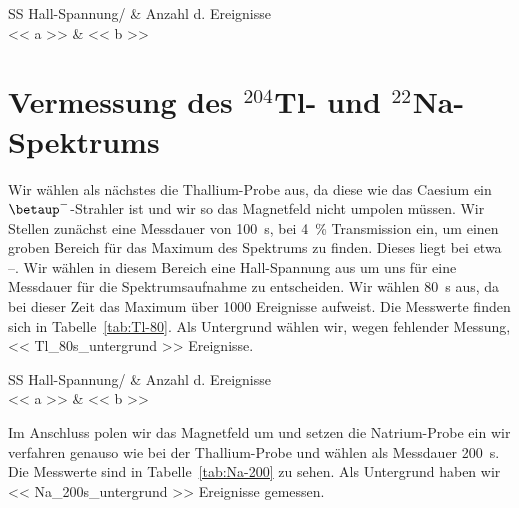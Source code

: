 \begin{table}[htbp]
    \centering
    \begin{tabular}{SS}
        {Hall-Spannung/\si{\skt}} & {Anzahl d. Ereignisse} \\
        \midrule
        << a >> & << b >> \\
    \end{tabular}
    \caption{%
        Messwerte zur Kalibrierung des Spektrometers. Probe: ${}^{137}$Cs,
        Zeit: \SI{100}{\second}, Transmission: \SI{1}{\percent}.
    }
    \label{tab:Cs-100}
\end{table}

\section{Vermessung des ${}^{204}$Tl- und ${}^{22}$Na-Spektrums}

Wir wählen als nächstes die Thallium-Probe aus, da diese wie das Caesium ein
$\betaup^-$-Strahler ist und wir so das Magnetfeld nicht umpolen müssen. Wir
Stellen zunächst eine Messdauer von \SI{100}{\second}, bei \SI{4}{\percent}
Transmission ein, um einen groben Bereich für das Maximum des Spektrums zu
finden. Dieses liegt bei etwa \SIrange{}{}{\skt}. Wir wählen in diesem Bereich
eine Hall-Spannung aus um uns für eine Messdauer für die Spektrumsaufnahme
zu entscheiden. Wir wählen \SI{80}{\second} aus, da bei dieser Zeit das Maximum
über \num{1000} Ereignisse aufweist. Die Messwerte finden sich in
Tabelle~\ref{tab:Tl-80}. Als Untergrund wählen wir, wegen fehlender Messung,
\num{<< Tl_80s_untergrund >>} Ereignisse.

\begin{table}[htbp]
    \centering
    \begin{tabular}{SS}
        {Hall-Spannung/\si{\skt}} & {Anzahl d. Ereignisse} \\
        \midrule
        << a >> & << b >> \\
    \end{tabular}
    \caption{%
        Messwerte zur Bestimmung des $\betaup$-Spektrums. Probe: ${}^{204}$Tl,
        Zeit: \SI{80}{\second}, Transmission: \SI{4}{\percent}.
    }
    \label{tab:Tl-80}
\end{table}

Im Anschluss polen wir das Magnetfeld um und setzen die Natrium-Probe ein wir
verfahren genauso wie bei der Thallium-Probe und wählen als Messdauer
\SI{200}{\second}. Die Messwerte sind in Tabelle~\ref{tab:Na-200} zu sehen. Als
Untergrund haben wir \num{<< Na_200s_untergrund >>} Ereignisse gemessen.

